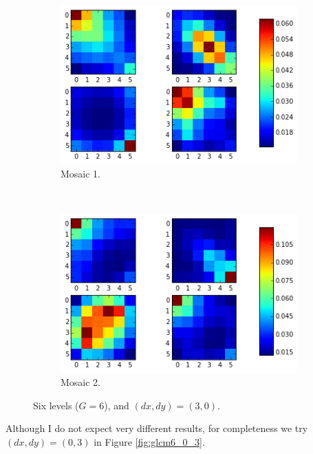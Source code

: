 \documentclass[a4paper]{article}
\begin{document}
\begin{figure}
    \centering
    \begin{subfigure}[b]{0.40\textwidth}
        \centering
        \includegraphics[width=\textwidth]{m1_3_0.png}
        \caption{%
            Mosaic 1.
        }
    \end{subfigure}
    ~
    \begin{subfigure}[b]{0.40\textwidth}
        \centering
        \includegraphics[width=\textwidth]{m2_3_0.png}
        \caption{%
            Mosaic 2.
        }
    \end{subfigure}
    \caption{%
        Six levels ($G = 6$), and $(dx, dy) = (3, 0)$.
    }
    \label{fig:glcm6_3_0}
\end{figure}

Although I do not expect very different results, for completeness we try
$(dx, dy) = (0, 3)$ in Figure \ref{fig:glcm6_0_3}.
\end{document}
